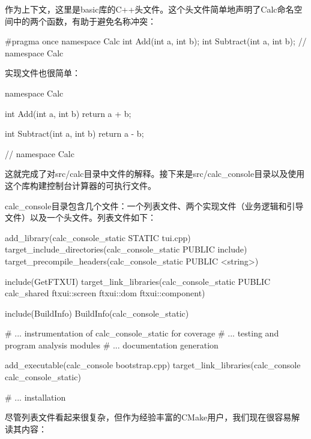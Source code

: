 作为上下文，这里是basic库的C++头文件。这个头文件简单地声明了Calc命名空间中的两个函数，有助于避免名称冲突：


\begin{cpp}
#pragma once
namespace Calc {
    int Add(int a, int b);
    int Subtract(int a, int b);
} // namespace Calc
\end{cpp}

实现文件也很简单：


\begin{cpp}
namespace Calc {
    int Add(int a, int b) {
        return a + b;
    }

    int Subtract(int a, int b) {
        return a - b;
    }
} // namespace Calc
\end{cpp}

这就完成了对src/calc目录中文件的解释。接下来是src/calc\_console目录以及使用这个库构建控制台计算器的可执行文件。


calc\_console目录包含几个文件：一个列表文件、两个实现文件（业务逻辑和引导文件）以及一个头文件。列表文件如下：


\begin{cmake}
add_library(calc_console_static STATIC tui.cpp)
target_include_directories(calc_console_static PUBLIC include)
target_precompile_headers(calc_console_static PUBLIC <string>)

include(GetFTXUI)
target_link_libraries(calc_console_static PUBLIC calc_shared
                      ftxui::screen ftxui::dom ftxui::component)

include(BuildInfo)
BuildInfo(calc_console_static)

# ... instrumentation of calc_console_static for coverage
# ... testing and program analysis modules
# ... documentation generation

add_executable(calc_console bootstrap.cpp)
target_link_libraries(calc_console calc_console_static)

# ... installation
\end{cmake}

尽管列表文件看起来很复杂，但作为经验丰富的CMake用户，我们现在很容易解读其内容：

